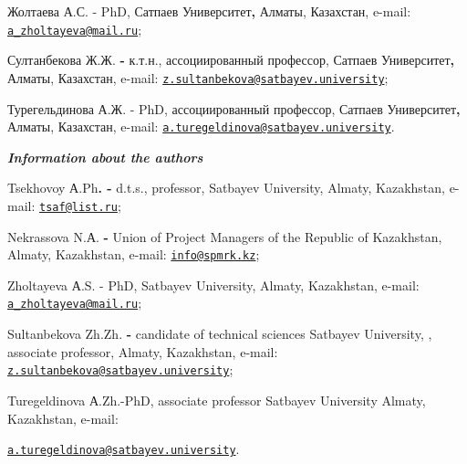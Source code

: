 Жолтаева А.С. - PhD, Сатпаев Университет{\bfseries ,} Алматы, Казахстан,
e-mail:
\href{mailto:a_zholtayeva@mail.ru}{\nolinkurl{a\_zholtayeva@mail.ru}};

Султанбекова Ж.Ж. {\bfseries -} к.т.н., ассоциированный профессор, Сатпаев
Университет{\bfseries ,} Алматы, Казахстан, e-mail:
\href{mailto:z.sultanbekova@satbayev.university}{\nolinkurl{z.sultanbekova@satbayev.university}};

Турегельдинова А.Ж. - PhD, ассоциированный профессор, Сатпаев
Университет{\bfseries ,} Алматы, Казахстан, e-mail:
\href{mailto:a.turegeldinova@satbayev.university}{\nolinkurl{a.turegeldinova@satbayev.university}}.

\emph{{\bfseries Information about the authors}}

Tsekhovoy А.Ph{\bfseries . -} d.t.s., professor, Satbayev University,
Almaty, Kazakhstan, e-mail:
\href{mailto:tsaf@list.ru}{\nolinkurl{tsaf@list.ru}};

Nekrassova N.А. {\bfseries -} Union of Project Managers of the Republic of
Kazakhstan, Almaty, Kazakhstan, e-mail:
\href{mailto:info@spmrk.kz}{\nolinkurl{info@spmrk.kz}};

Zholtayeva А.S. - PhD, Satbayev University, Almaty, Kazakhstan, e-mail:
\href{mailto:a_zholtayeva@mail.ru}{\nolinkurl{a\_zholtayeva@mail.ru}};

Sultanbekova Zh.Zh. {\bfseries -} candidate of technical sciences Satbayev
University, , associate professor, Almaty, Kazakhstan, e-mail:
\href{mailto:z.sultanbekova@satbayev.university}{\nolinkurl{z.sultanbekova@satbayev.university}};

Turegeldinova А.Zh.-PhD, associate professor Satbayev University Almaty,
Kazakhstan, e-mail:

\href{mailto:a.turegeldinova@satbayev.university}{\nolinkurl{a.turegeldinova@satbayev.university}}.